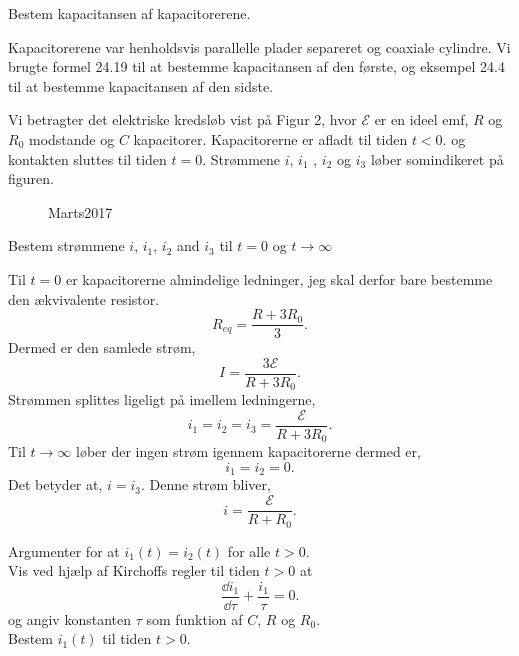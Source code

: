 \begin{subexercise}[b]
	Bestem kapacitansen af kapacitorerene.
\end{subexercise}
\begin{solution}
Kapacitorerene var henholdsvis parallelle plader separeret og coaxiale cylindre. Vi brugte formel 24.19 til at bestemme kapacitansen af den første, og eksempel 24.4 til at bestemme kapacitansen af den sidste.
\end{solution}
\begin{exercise}
Vi betragter det elektriske kredsløb vist på Figur 2, hvor $\mathcal{E} $ er en ideel emf, $R$ og $R_0$ modstande og $C$ kapacitorer. Kapacitorerne er afladt til tiden $t<0$.
og kontakten sluttes til tiden $t=0$. Strømmene $i$, $i_1$ , $i_2$ og $i_3$ løber somindikeret på figuren.
\end{exercise}
\begin{figure}[ht]
    \centering
    \caption{Marts2017}
    \label{fig:marts2017}
\end{figure}
\begin{subexercise}[a]
Bestem strømmene $i$, $i_1$, $i_2$ and $i_3$ til $t=0$ og $t\to \infty$
\end{subexercise}
\begin{solution}
Til $t=0$ er kapacitorerne almindelige ledninger, jeg skal derfor bare bestemme den ækvivalente resistor.
 \[
R_{eq} = \frac{R+3R_0}{3}
.\] 
Dermed er den samlede strøm,
\[
I = \frac{3\mathcal{E} }{R+3R_0}
.\] 
Strømmen splittes ligeligt på imellem ledningerne,
\[
i_1 = i_2 = i_3 = \frac{\mathcal{E} }{R+3R_0}
.\] 
Til $t\to \infty$ løber der ingen strøm igennem kapacitorerne dermed er,
\[
i_1 = i_2 = 0
.\] 
Det betyder at, $i = i_3$. Denne strøm bliver,
\[
i = \frac{\mathcal{E} }{R + R_0}
.\] 
\end{solution}
\begin{subexercise}[b]
Argumenter for at $i_1\left( t \right) =  i_2\left( t \right) $ for alle $t>0$.\\
Vis ved hjælp af Kirchoffs regler til tiden $t>0$ at
 \[
\frac{\dd i_1}{\dd \tau} + \frac{i_1}{\tau} = 0
.\] 
og angiv konstanten $\tau$ som funktion af $C$, $R$ og $R_0$.\\
Bestem $i_1\left( t \right) $ til tiden $t>0$.
\end{subexercise}
